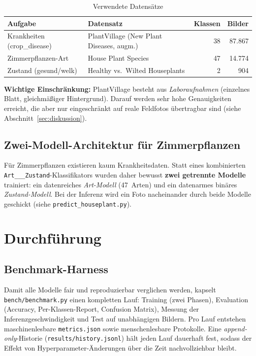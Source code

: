 \documentclass[11pt,a4paper]{article}
\begin{document}
\begin{table}[h]
\centering
\caption{Verwendete Datensätze}
\label{tab:datasets}
\small
\begin{tabularx}{\linewidth}{@{}lXrr@{}}
\toprule
\textbf{Aufgabe} & \textbf{Datensatz} & \textbf{Klassen} & \textbf{Bilder} \\
\midrule
Krankheiten (crop\_disease)      & PlantVillage (New Plant Diseases, augm.) & 38 & 87.867 \\
Zimmerpflanzen-Art               & House Plant Species                      & 47 & 14.774 \\
Zustand (gesund/welk)            & Healthy vs.\ Wilted Houseplants          &  2 &    904 \\
\bottomrule
\end{tabularx}
\end{table}

\noindent
\textbf{Wichtige Einschränkung:} PlantVillage besteht aus \emph{Laboraufnahmen}
(einzelnes Blatt, gleichmäßiger Hintergrund). Darauf werden sehr hohe
Genauigkeiten erreicht, die aber nur eingeschränkt auf reale Feldfotos
übertragbar sind (siehe Abschnitt~\ref{sec:diskussion}).

\subsection{Zwei-Modell-Architektur für Zimmerpflanzen}
Für Zimmerpflanzen existieren kaum Krankheitsdaten. Statt eines kombinierten
\texttt{Art\_\_\_Zustand}-Klassifikators wurden daher bewusst \textbf{zwei
getrennte Modelle} trainiert: ein datenreiches \emph{Art-Modell} (47~Arten) und
ein datenarmes binäres \emph{Zustand-Modell}. Bei der Inferenz wird ein Foto
nacheinander durch beide Modelle geschickt (siehe \texttt{predict\_houseplant.py}).

\section{Durchführung}

\subsection{Benchmark-Harness}
Damit alle Modelle fair und reproduzierbar verglichen werden, kapselt
\texttt{bench/benchmark.py} einen kompletten Lauf: Training (zwei Phasen),
Evaluation (Accuracy, Per-Klassen-Report, Confusion Matrix), Messung der
Inferenzgeschwindigkeit und Test auf unabhängigen Bildern. Pro Lauf entstehen
maschinenlesbare \texttt{metrics.json} sowie menschenlesbare Protokolle. Eine
\emph{append-only}-Historie (\texttt{results/history.jsonl}) hält jeden Lauf
dauerhaft fest, sodass der Effekt von Hyperparameter-Änderungen über die Zeit
nachvollziehbar bleibt.
\end{document}
